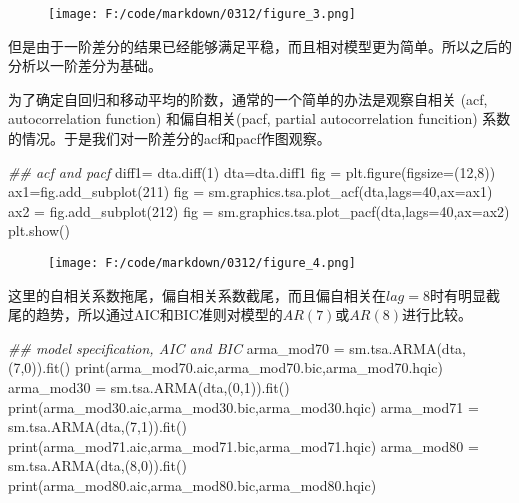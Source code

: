 \documentclass[]{article}
\newenvironment{Shaded}{}{}
\newcommand{\DecValTok}[1]{\textcolor[rgb]{0.25,0.63,0.44}{#1}}
\newcommand{\CommentTok}[1]{\textcolor[rgb]{0.38,0.63,0.69}{\textit{#1}}}
\newcommand{\OperatorTok}[1]{\textcolor[rgb]{0.40,0.40,0.40}{#1}}
\newcommand{\BuiltInTok}[1]{#1}
\newcommand{\NormalTok}[1]{#1}
\begin{document}
\begin{figure}
\centering
\texttt{[image: F:/code/markdown/0312/figure\_3.png]}
\caption{}
\end{figure}

但是由于一阶差分的结果已经能够满足平稳，而且相对模型更为简单。所以之后的分析以一阶差分为基础。

为了确定自回归和移动平均的阶数，通常的一个简单的办法是观察自相关 (acf,
autocorrelation function) 和偏自相关(pacf, partial autocorrelation
funcition) 系数的情况。于是我们对一阶差分的acf和pacf作图观察。

\begin{Shaded}
\begin{Highlighting}[]
\CommentTok{## acf and pacf}
\NormalTok{diff1}\OperatorTok{=}\NormalTok{ dta.diff(}\DecValTok{1}\NormalTok{)}
\NormalTok{dta}\OperatorTok{=}\NormalTok{dta.diff1}
\NormalTok{fig }\OperatorTok{=}\NormalTok{ plt.figure(figsize}\OperatorTok{=}\NormalTok{(}\DecValTok{12}\NormalTok{,}\DecValTok{8}\NormalTok{))}
\NormalTok{ax1}\OperatorTok{=}\NormalTok{fig.add_subplot(}\DecValTok{211}\NormalTok{)}
\NormalTok{fig }\OperatorTok{=}\NormalTok{ sm.graphics.tsa.plot_acf(dta,lags}\OperatorTok{=}\DecValTok{40}\NormalTok{,ax}\OperatorTok{=}\NormalTok{ax1)}
\NormalTok{ax2 }\OperatorTok{=}\NormalTok{ fig.add_subplot(}\DecValTok{212}\NormalTok{)}
\NormalTok{fig }\OperatorTok{=}\NormalTok{ sm.graphics.tsa.plot_pacf(dta,lags}\OperatorTok{=}\DecValTok{40}\NormalTok{,ax}\OperatorTok{=}\NormalTok{ax2)}
\NormalTok{plt.show()}
\end{Highlighting}
\end{Shaded}

\begin{figure}
\centering
\texttt{[image: F:/code/markdown/0312/figure\_4.png]}
\caption{}
\end{figure}

这里的自相关系数拖尾，偏自相关系数截尾，而且偏自相关在\(lag=8\)时有明显截尾的趋势，所以通过AIC和BIC准则对模型的\(AR(7)\)或\(AR(8)\)进行比较。

\begin{Shaded}
\begin{Highlighting}[]
\CommentTok{## model specification, AIC and BIC}
\NormalTok{arma_mod70 }\OperatorTok{=}\NormalTok{ sm.tsa.ARMA(dta,(}\DecValTok{7}\NormalTok{,}\DecValTok{0}\NormalTok{)).fit()}
\BuiltInTok{print}\NormalTok{(arma_mod70.aic,arma_mod70.bic,arma_mod70.hqic)}
\NormalTok{arma_mod30 }\OperatorTok{=}\NormalTok{ sm.tsa.ARMA(dta,(}\DecValTok{0}\NormalTok{,}\DecValTok{1}\NormalTok{)).fit()}
\BuiltInTok{print}\NormalTok{(arma_mod30.aic,arma_mod30.bic,arma_mod30.hqic)}
\NormalTok{arma_mod71 }\OperatorTok{=}\NormalTok{ sm.tsa.ARMA(dta,(}\DecValTok{7}\NormalTok{,}\DecValTok{1}\NormalTok{)).fit()}
\BuiltInTok{print}\NormalTok{(arma_mod71.aic,arma_mod71.bic,arma_mod71.hqic)}
\NormalTok{arma_mod80 }\OperatorTok{=}\NormalTok{ sm.tsa.ARMA(dta,(}\DecValTok{8}\NormalTok{,}\DecValTok{0}\NormalTok{)).fit() }
\BuiltInTok{print}\NormalTok{(arma_mod80.aic,arma_mod80.bic,arma_mod80.hqic)}
\end{Highlighting}
\end{Shaded}
\end{document}
